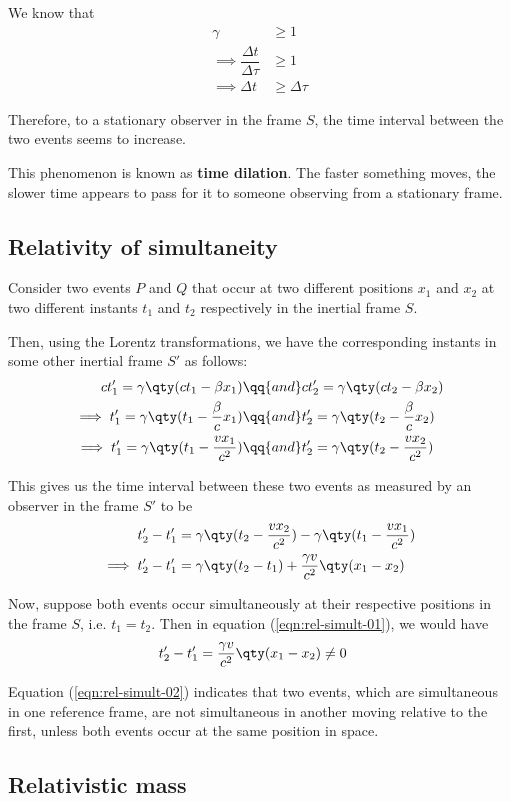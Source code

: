		We know that
		\begin{align*}
			\gamma&\geqslant 1 \\
			\implies\dfrac{\Delta t}{\Delta\tau}&\geqslant 1 \\
			\implies\Delta t&\geqslant\Delta\tau
		\end{align*}
		
		Therefore, to a stationary observer in the frame $S$, the time interval between the two events seems to increase.
		
		This phenomenon is known as \textbf{time dilation}. The faster something moves, the slower time appears to pass for it to someone observing from a stationary frame.
		
	\subsection{Relativity of simultaneity}
		\setcounter{equation}{0}
		Consider two events $P$ and $Q$ that occur at two different positions $x_1$ and $x_2$ at two different instants $t_1$ and $t_2$ respectively in the inertial frame $S$.
		
		Then, using the Lorentz transformations, we have the corresponding instants in some other inertial frame $S'$ as follows:
		\begin{align*}
			ct_1'=\gamma\qty(ct_1-\beta x_1)&\qq{and}ct_2'=\gamma\qty(ct_2-\beta x_2) \\
			\implies t_1'=\gamma\qty(t_1-\dfrac{\beta}{c}x_1)&\qq{and}t_2'=\gamma\qty(t_2-\dfrac{\beta}{c}x_2) \\
			\implies t_1'=\gamma\qty(t_1-\dfrac{vx_1}{c^2})&\qq{and}t_2'=\gamma\qty(t_2-\dfrac{vx_2}{c^2})
		\end{align*}
		
		This gives us the time interval between these two events as measured by an observer in the frame $S'$ to be
		\begin{align}
			t_2'-t_1'&=\gamma\qty(t_2-\dfrac{vx_2}{c^2})-\gamma\qty(t_1-\dfrac{vx_1}{c^2}) \nonumber\\
			\implies t_2'-t_1'&=\gamma\qty(t_2-t_1)+\dfrac{\gamma v}{c^2}\qty(x_1-x_2) \label{eqn:rel-simult-01}
		\end{align}
		
		Now, suppose both events occur simultaneously at their respective positions in the frame $S$, i.e. $t_1=t_2$. Then in equation (\ref{eqn:rel-simult-01}), we would have
		\begin{align}
			t_2'-t_1'&=\dfrac{\gamma v}{c^2}\qty(x_1-x_2)\neq 0 \label{eqn:rel-simult-02}
		\end{align}
		
		Equation (\ref{eqn:rel-simult-02}) indicates that two events, which are simultaneous in one reference frame, are not simultaneous in another moving relative to the first, unless both events occur at the same position in space.
		
	\subsection{Relativistic mass}